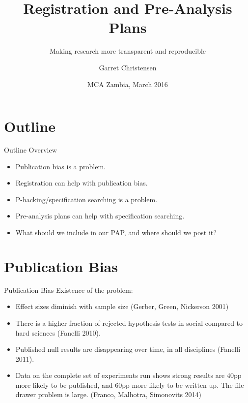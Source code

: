 \documentclass{beamer}
\title[Implementation: Registration and Pre-Analysis Plans] %
{Registration and Pre-Analysis Plans}
\subtitle
{Making research more transparent and reproducible}
\author[Garret Christensen] %
{Garret Christensen\inst{1}}
\institute[Universities of Somewhere and Elsewhere] %
{
  \inst{1}%
  Berkeley Initiative for Transparency in the Social Sciences\\
  University of California Berkeley\\
  and\\
  Berkeley Institute for Data Science
}
\date %
{MCA Zambia, March 2016}
\begin{document}
    
\begin{frame}
  \titlepage
\end{frame}



\section{Outline}

\begin{frame}[label=main]{Outline}
Overview
\begin{itemize}
\item
Publication bias is a problem.

\item
Registration can help with publication bias.
\item
P-hacking/specification searching is a problem.
\item
Pre-analysis plans can help with specification searching.
\item
What should we include in our PAP, and where should we post it?
\end{itemize}
\end{frame}
\section*{Publication Bias}
\begin{frame}{Publication Bias}%
  Existence of the problem:
  \begin{itemize}[<.->]
  \item
 Effect sizes diminish with sample size (Gerber, Green, Nickerson 2001)
  \item
  There is a higher fraction of rejected hypothesis tests in social compared to hard sciences (Fanelli 2010).
  \item
  	Published null results are disappearing over time, in all disciplines (Fanelli 2011). 
  \item
  	Data on the complete set of experiments run shows strong results are 40pp more likely to be published, and 60pp more likely to be written up. The file drawer problem is large. (Franco, Malhotra, Simonovits 2014)
  \end{itemize}
\end{frame}
\end{document}

